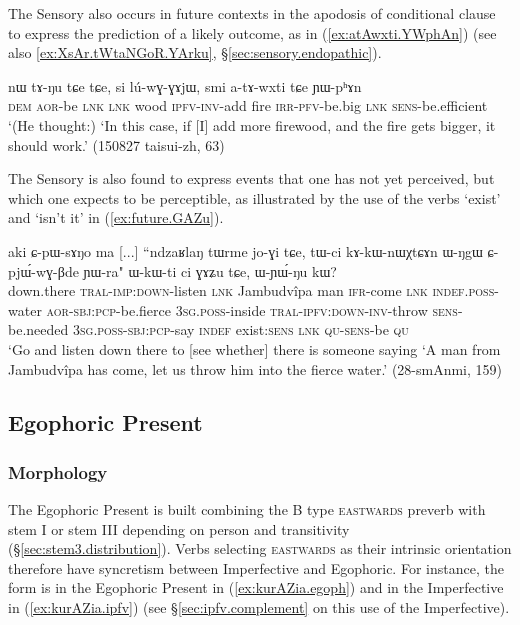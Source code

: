 The Sensory also occurs in future contexts in the apodosis of conditional clause to express the prediction of a likely outcome, as in (\ref{ex:atAwxti.YWphAn}) (see also \ref{ex:XsAr.tWtaNGoR.YArku}, §\ref{sec:sensory.endopathic}).

\begin{exe}
\ex \label{ex:atAwxti.YWphAn}
\gll nɯ tɤ-ŋu tɕe tɕe, si lú-wɣ-ɣɤjɯ, smi a-tɤ-wxti tɕe ɲɯ-pʰɤn \\
\textsc{dem} \textsc{aor}-be \textsc{lnk} \textsc{lnk} wood \textsc{ipfv}-\textsc{inv}-add fire \textsc{irr}-\textsc{pfv}-be.big \textsc{lnk} \textsc{sens}-be.efficient \\
\glt `(He thought:) `In this case, if [I] add more firewood, and the fire gets bigger, it should work.' (150827 taisui-zh, 63)
\end{exe}

The Sensory is also found to express events that one has not yet perceived, but which one expects to be perceptible, as illustrated by the use of the verbs  `exist' and  `isn't it' in (\ref{ex:future.GAZu}).

\begin{exe}
\ex \label{ex:future.GAZu}
\gll  aki ɕ-pɯ-sɤŋo ma [...] ``ndzaʁlaŋ tɯrme jo-ɣi tɕe, tɯ-ci kɤ-kɯ-nɯχtɕɤn ɯ-ŋgɯ ɕ-pjɯ́-wɣ-βde ɲɯ-ra" ɯ-kɯ-ti ci ɣɤʑu tɕe, ɯ-ɲɯ́-ŋu kɯ? \\
down.there \textsc{tral}-\textsc{imp}:\textsc{down}-listen \textsc{lnk} { } Jambudvîpa man \textsc{ifr}-come \textsc{lnk} \textsc{indef}.\textsc{poss}-water \textsc{aor}-\textsc{sbj}:\textsc{pcp}-be.fierce \textsc{3sg}.\textsc{poss}-inside \textsc{tral}-\textsc{ipfv}:\textsc{down}-\textsc{inv}-throw \textsc{sens}-be.needed \textsc{3sg}.\textsc{poss}-\textsc{sbj}:\textsc{pcp}-say \textsc{indef} exist:\textsc{sens} \textsc{lnk} \textsc{qu}-\textsc{sens}-be \textsc{qu} \\
\glt `Go and listen down there to [see whether] there is someone saying `A man from Jambudvîpa has come, let us throw him into the fierce water.' (28-smAnmi, 159)
\end{exe}

\subsection{Egophoric Present} \label{sec:egophoric}


\subsubsection{Morphology} \label{sec:egophoric.morphology}
The Egophoric Present is built combining the B type \textsc{eastwards}  preverb with stem I or stem III depending on person and transitivity (§\ref{sec:stem3.distribution}). Verbs selecting \textsc{eastwards} as their intrinsic orientation therefore have syncretism between Imperfective and Egophoric. For instance, the form  is in the Egophoric Present in (\ref{ex:kurAZia.egoph}) and in the Imperfective in (\ref{ex:kurAZia.ipfv}) (see §\ref{sec:ipfv.complement} on this use of the Imperfective).

